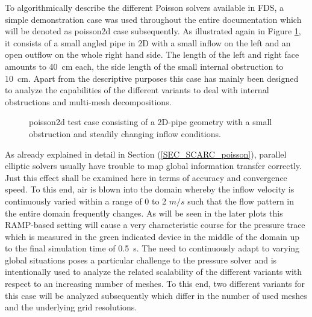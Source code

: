 To algorithmically describe the different Poisson solvers available in FDS, a simple demonstration case was used throughout the entire documentation which will be denoted as {\ct poisson2d} case subsequently. As illustrated again in Figure \ref{FIG_scarc_poisson_geometry}, it consists of a small angled pipe in 2D with a small inflow on the left and an open outflow on the whole right hand side. The length of the left and right face amounts to 40~cm each, the side length of the small internal obstruction to 10~cm.
Apart from the descriptive purposes this case has mainly been designed to analyze the capabilities of the different \scarc{} variants to deal with internal obstructions and multi-mesh decompositions.

\begin{figure}[ht]
\begin{center}

\end{center}
\caption[{\ct poisson2d} test case]{{\ct poisson2d} test case consisting of a 2D-pipe geometry with a small obstruction and steadily changing inflow conditions.}
\label{FIG_scarc_poisson_geometry}
\end{figure}

As already explained in detail in Section (\ref{SEC_SCARC_poisson}), parallel elliptic solvers usually have trouble to map global information transfer correctly. Just this effect shall be examined here in terms of accuracy and convergence speed. 
To this end, air is blown into the domain whereby the inflow velocity is continuously varied within a range of 0 to 2 $m/s$
such that the flow pattern in the entire domain frequently changes. As will be seen in the later plots this RAMP-based setting will cause a very characteristic course for the pressure trace which is measured in the green indicated device in the middle of the domain up to the final simulation time of 0.5~s.
%
The need to continuously adapt to varying global situations poses a particular challenge to the pressure solver and is intentionally used to analyze the related scalability of the different variants with respect to an increasing number of meshes.
To this end, two different variants for this case will be analyzed subsequently which differ in the number of used meshes and the underlying grid resolutions.

